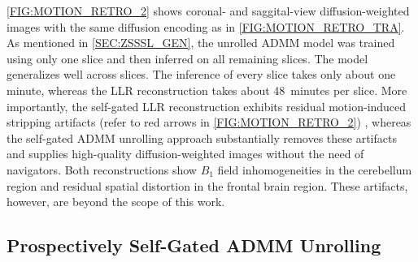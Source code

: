 \documentclass[journal,twoside,web]{ieeecolor}
\begin{document}
	\cref{FIG:MOTION_RETRO_2} shows coronal- and saggital-view 
	diffusion-weighted images
	with the same diffusion encoding as in \cref{FIG:MOTION_RETRO_TRA}.
	As mentioned in \cref{SEC:ZSSSL_GEN}, the unrolled ADMM model 
	was trained using only one slice
	and then inferred on all remaining slices.
	The model generalizes well across slices.
	The inference of every slice takes only about one minute,
	whereas the LLR reconstruction takes about 48~minutes per slice.
	More importantly, the self-gated LLR reconstruction exhibits residual
	motion-induced stripping artifacts 
	(refer to red arrows in \cref{FIG:MOTION_RETRO_2}) \cite{chang_2021_musium},
	whereas the self-gated ADMM unrolling approach substantially removes these artifacts
	and supplies high-quality diffusion-weighted images without the need of navigators.
	Both reconstructions show $B_1$ field inhomogeneities in the cerebellum region 
	and residual spatial distortion in the frontal brain region. 
	These artifacts, however, are beyond the scope of this work.
	

	\subsection{Prospectively Self-Gated ADMM Unrolling}
\end{document}
